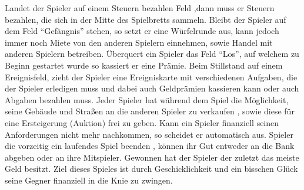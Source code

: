 \documentclass[a4paper,10pt]{article}
\begin{document}
Landet der Spieler auf einem \glqq Steuern bezahlen Feld \grqq ,dann muss er Steuern bezahlen, die sich in der Mitte des Spielbretts sammeln. Bleibt der Spieler auf dem  Feld ``Gefängnis'' stehen, so setzt er eine Würfelrunde aus, kann jedoch immer noch Miete von den anderen Spielern einnehmen, sowie Handel mit anderen Spielern betreiben.  Überquert ein Spieler  das Feld ``Los'', auf welchem zu Beginn gestartet wurde so kassiert er eine Prämie. Beim Stillstand auf einem Ereignisfeld, zieht der Spieler eine Ereigniskarte mit verschiedenen Aufgaben, die der Spieler erledigen muss und dabei auch Geldprämien kassieren kann oder auch Abgaben bezahlen muss.  Jeder Spieler hat während dem Spiel die Möglichkeit, seine Gebäude und Straßen an die anderen Spieler zu verkaufen , sowie diese für eine Ersteigerung (Auktion) frei zu geben. Kann ein Spieler finanziell seinen Anforderungen nicht mehr nachkommen, so scheidet er automatisch aus. Spieler die vorzeitig ein laufendes Spiel beenden , können ihr Gut entweder an die Bank abgeben oder an ihre Mitspieler. Gewonnen hat der Spieler der zuletzt das meiste Geld besitzt. Ziel dieses Spieles ist durch Geschicklichkeit und ein bisschen Glück seine Gegner finanziell in die Knie zu zwingen.
\end{document}
